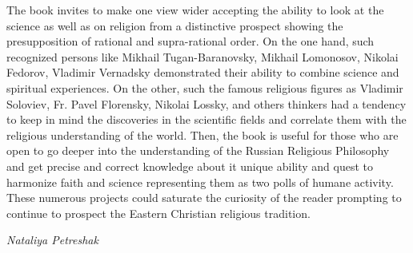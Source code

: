 \documentclass[a4paper]{article}
\begin{document}
{\color{black}
 The book invites to make one view wider accepting the ability to look at the science as well as on religion from a
distinctive prospect showing the presupposition of rational and supra-rational order. On the one hand, such recognized
persons like Mikhail Tugan-Baranovsky, Mikhail Lomonosov, Nikolai Fedorov, Vladimir Vernadsky demonstrated their
ability to combine science and spiritual experiences. On the other, such the famous religious figures as Vladimir
Soloviev, Fr. Pavel Florensky, Nikolai Lossky, and others thinkers had a tendency to keep in mind the discoveries in
the scientific fields and correlate them with the religious understanding of the world. Then, the book is useful for
those who are open to go deeper into the understanding of the Russian Religious Philosophy and get precise and correct
knowledge about it unique ability and quest to harmonize faith and science representing them as two polls of humane
activity. These numerous projects could saturate the curiosity of the reader prompting to continue to prospect the
Eastern Christian religious tradition.}

{\raggedleft\color{black}
 \textit{Nataliya Petreshak}
\par}
\end{document}
